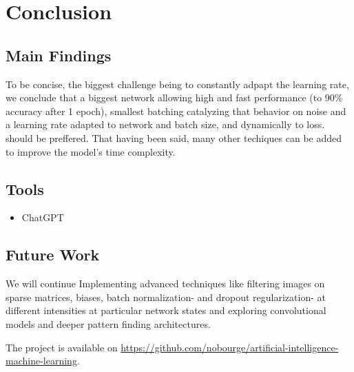 \documentclass[utf8,1pt]{extarticle} %
\begin{document}
\section{Conclusion}
\subsection{Main Findings}
To be concise, 
the biggest challenge being to constantly adpapt the learning rate,
we conclude that a biggest network allowing high and fast performance (to 90\% accuracy after 1 epoch),
smallest batching catalyzing that behavior on noise and
a learning rate adapted to network and batch size, and dynamically to loss.
should be preffered.
That having been said, many other techiques can be added to improve the model's time complexity. 
\subsection{Tools}
\begin{itemize}
    \item ChatGPT
\end{itemize}
\subsection{Future Work}
We will continue Implementing advanced techniques like filtering images on sparse matrices,
biases, batch normalization- and dropout regularization- at different intensities
at particular network states and exploring convolutional models and
deeper pattern finding architectures.

The project is available on \href{https://github.com/nobourge/artificial-intelligence-machine-learning}{https://github.com/nobourge/artificial-intelligence-machine-learning}.




% 
\end{document}
